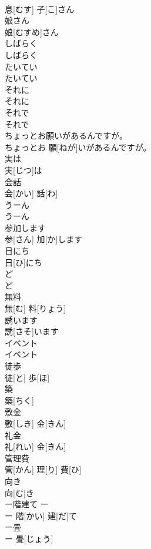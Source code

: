 \documentclass[8pt]{extreport}
\begin{document}
\begin{CJK}{UTF8}{min}
\\	息[むす] 子[こ]さん		
\\	娘さん	
\\	娘[むすめ]さん		
\\	しばらく	
\\	しばらく		
\\	たいてい	
\\	たいてい		
\\	それに	
\\	それに		
\\	それで	
\\	それで		
\\	ちょっとお願いがあるんですが。	
\\	ちょっとお 願[ねが]いがあるんですが。		
\\	実は	
\\	実[じつ]は		
\\	会話	
\\	会[かい] 話[わ]		
\\	うーん	
\\	うーん		
\\	参加します	
\\	参[さん] 加[か]します		
\\	日にち	
\\	日[ひ]にち		
\\	ど	
\\	ど		
\\	無料	
\\	無[む] 料[りょう]		
\\	誘います	
\\	誘[さそ]います		
\\	イベント	
\\	イベント		
\\	徒歩	
\\	徒[と] 歩[ほ]		
\\	築	
\\	築[ちく]		
\\	敷金	
\\	敷[しき] 金[きん]		
\\	礼金	
\\	礼[れい] 金[きん]		
\\	管理費	
\\	管[かん] 理[り] 費[ひ]		
\\	向き	
\\	向[む]き		
\\	ー階建て	ー 
\\	ー 階[かい] 建[だ]て		
\\	ー畳	
\\	ー 畳[じょう]		

\end{CJK}
\end{document}
